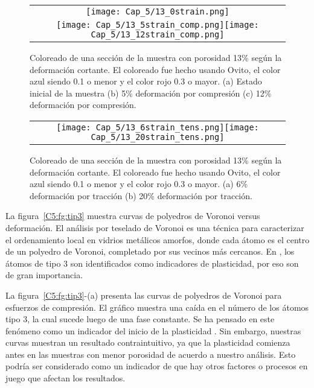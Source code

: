 \begin{figure}[h!]
  \centering
  \begin{tabular}{c}
    \texttt{[image: Cap\_5/13\_0strain.png]} \\
    \texttt{[image: Cap\_5/13\_5strain\_comp.png]}\texttt{[image: Cap\_5/13\_12strain\_comp.png]} \\
  \end{tabular}
  \caption[Coloreado de una sección de la muestra con porosidad 13\% según la deformación cortante.]{Coloreado de una sección de la muestra con
  porosidad 13\% según la deformación cortante. El coloreado fue hecho usando Ovito, el color azul siendo 0.1 o menor y el color rojo 0.3 o mayor.
  (a) Estado inicial de la muestra (b) 5\% deformación por compresión (c) 12\% deformación por compresión.}
  \label{C5:fg:ss_comp}
\end{figure}

\begin{figure}[h!]
  \centering
  \begin{tabular}{c}
    \texttt{[image: Cap\_5/13\_6strain\_tens.png]}\texttt{[image: Cap\_5/13\_20strain\_tens.png]} \\
  \end{tabular}
  \caption[Coloreado de una sección de la muestra con porosidad 13\% según la deformación cortante.]{Coloreado de una sección de la muestra con
  porosidad 13\% según la deformación cortante. El coloreado fue hecho usando Ovito, el color azul siendo 0.1 o menor y el color rojo 0.3 o
  mayor. (a) 6\% deformación por tracción (b) 20\% deformación por tracción.}
  \label{C5:fg:ss_tens}
\end{figure}

La figura~\ref{C5:fg:tip3} muestra curvas de polyedros de Voronoi versus deformación. El análisis por teselado de Voronoi es una técnica para
caracterizar el ordenamiento local en vidrios metálicos amorfos, donde cada átomo es el centro de un polyedro de Voronoi,
completado por sus vecinos más cercanos. En \cite{arman10}, los átomos de tipo 3 son identificados como indicadores de plasticidad, por eso
son de gran importancia.

La figura~\ref{C5:fg:tip3}-(a) presenta las curvas de polyedros de Voronoi para esfuerzos de compresión. El gráfico muestra una caída en el número
de los átomos tipo 3, la cual sucede luego de una fase constante. Se ha pensado en este fenómeno como un indicador del inicio de la plasticidad
\citep{arman10}. Sin embargo, nuestras curvas muestran un resultado contraintuitivo, ya que la plasticidad comienza antes en las muestras con menor
porosidad de acuerdo a nuestro análisis. Esto podría ser considerado como un indicador de que hay otros factores o procesos en juego que afectan
los resultados.

